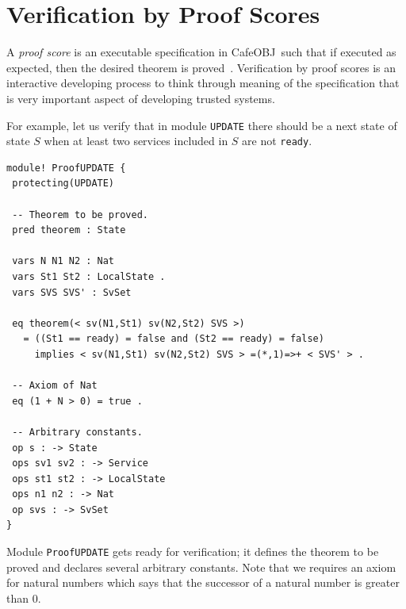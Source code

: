 \documentclass[12pt]{report}
\newcommand{\cafeobj}{{\sf CafeOBJ}~}
\begin{document}
\section{Verification by Proof Scores}
\label{sec:pscore}
A {\it proof score} is an executable specification in \cafeobj such
that if executed as expected, then the desired theorem is
proved~\cite{FutatsugiGO12pps}. Verification by proof scores is an
interactive developing process to think through meaning of the
specification that is very important aspect of developing trusted
systems.

For example, let us verify that in module {\tt UPDATE} there should be
a next state of state $S$ when at least two services included in $S$
are not {\tt ready}.
\begin{verbatim}
module! ProofUPDATE {
 protecting(UPDATE)

 -- Theorem to be proved.
 pred theorem : State

 vars N N1 N2 : Nat
 vars St1 St2 : LocalState .
 vars SVS SVS' : SvSet

 eq theorem(< sv(N1,St1) sv(N2,St2) SVS >)
   = ((St1 == ready) = false and (St2 == ready) = false)
     implies < sv(N1,St1) sv(N2,St2) SVS > =(*,1)=>+ < SVS' > .

 -- Axiom of Nat
 eq (1 + N > 0) = true .

 -- Arbitrary constants.
 op s : -> State
 ops sv1 sv2 : -> Service
 ops st1 st2 : -> LocalState
 ops n1 n2 : -> Nat
 op svs : -> SvSet
}
\end{verbatim}
Module {\tt ProofUPDATE} gets ready for verification; it defines the
theorem to be proved and declares several arbitrary constants.  Note
that we requires an axiom for natural numbers which says that the
successor of a natural number is greater than 0.
\end{document}
